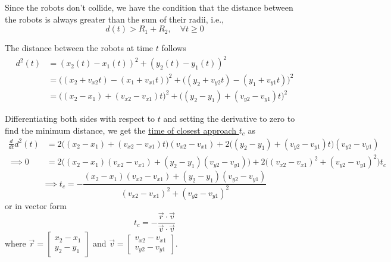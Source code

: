 Since the robots don't collide, we have the condition that the distance between the robots is always greater than the sum of their radii, i.e.,
\begin{equation*}
    \boxed{
        d(t) > R_1 + R_2, \quad \forall t \geq 0
    }
\end{equation*}

The distance between the robots at time \( t \) follows
\begin{align*}
    d^2(t)
     & =
    (x_2(t) - x_1(t))^2 + (y_2(t) - y_1(t))^2
    \\ & =
    \big((x_2 + v_{x2}t) - (x_1 + v_{x1}t)\big)^2 + \big((y_2 + v_{y2}t) - (y_1 + v_{y1}t)\big)^2
    \\ & =
    \big((x_2 - x_1) + (v_{x2} - v_{x1})t\big)^2 + \big((y_2 - y_1) + (v_{y2} - v_{y1})t\big)^2
\end{align*}

Differentiating both sides with respect to \( t \) and setting the derivative to zero to find the minimum distance, we get the \underline{time of closest approach \( t_c \)} as
\begin{align*}
    \frac{d}{dt}d^2(t)
     & =
    2\big((x_2 - x_1) + (v_{x2} - v_{x1})t\big)(v_{x2} - v_{x1}) + 2\big((y_2 - y_1) + (v_{y2} - v_{y1})t\big)(v_{y2} - v_{y1})
    \\ \implies
    0
     & =
    2\big((x_2 - x_1)(v_{x2} - v_{x1}) + (y_2 - y_1)(v_{y2} - v_{y1})\big) + 2\big((v_{x2} - v_{x1})^2 + (v_{y2} - v_{y1})^2\big) t_c
\end{align*}
\begin{equation*}
    \implies
    \boxed{
        t_c
        =
        -\frac{(x_2 - x_1)(v_{x2} - v_{x1}) + (y_2 - y_1)(v_{y2} - v_{y1})}{(v_{x2} - v_{x1})^2 + (v_{y2} - v_{y1})^2}
    }
\end{equation*}
or in vector form
\begin{equation*}
    t_c
    =
    -\frac{\vec{r} \cdot \vec{v}}{\vec{v} \cdot \vec{v}}
\end{equation*}
where \( \vec{r} = \begin{bmatrix} x_2 - x_1 \\ y_2 - y_1 \end{bmatrix} \) and \( \vec{v} = \begin{bmatrix} v_{x2} - v_{x1} \\ v_{y2} - v_{y1} \end{bmatrix} \).

